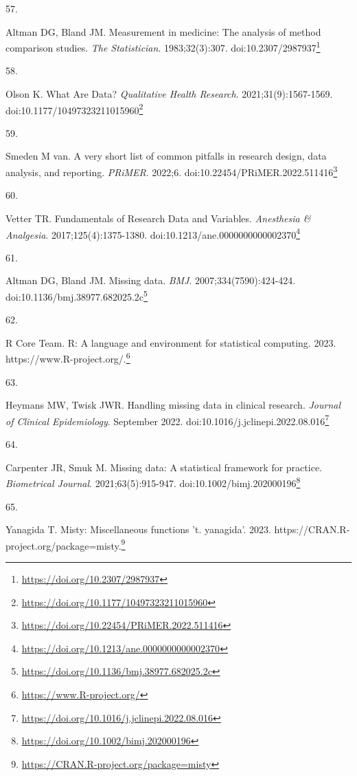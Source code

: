 \documentclass[
  a4paper,
]{book}
\newlength{\cslhangindent}
\newlength{\csllabelwidth}
\newlength{\cslentryspacingunit} %
\newenvironment{CSLReferences}[2] %
 {%
  \setlength{\parindent}{0pt}
  \ifodd #1
  \let\oldpar\par
  \def\par{\hangindent=\cslhangindent\oldpar}
  \fi
  \setlength{\parskip}{#2\cslentryspacingunit}
 }%
 {}
\newcommand{\CSLLeftMargin}[1]{\parbox[t]{\csllabelwidth}{#1}}
\newcommand{\CSLRightInline}[1]{\parbox[t]{\linewidth - \csllabelwidth}{#1}\break}
\renewcommand{\href}[2]{#2\footnote{\url{#1}}}
\begin{document}
\begin{CSLReferences}{0}{0}
\leavevmode{}%
\CSLLeftMargin{57. }%
\CSLRightInline{Altman DG, Bland JM. Measurement in medicine: The analysis of method comparison studies. \emph{The Statistician}. 1983;32(3):307. doi:\href{https://doi.org/10.2307/2987937}{10.2307/2987937}}

\leavevmode{}%
\CSLLeftMargin{58. }%
\CSLRightInline{Olson K. What Are Data? \emph{Qualitative Health Research}. 2021;31(9):1567-1569. doi:\href{https://doi.org/10.1177/10497323211015960}{10.1177/10497323211015960}}

\leavevmode{}%
\CSLLeftMargin{59. }%
\CSLRightInline{Smeden M van. A very short list of common pitfalls in research design, data analysis, and reporting. \emph{PRiMER}. 2022;6. doi:\href{https://doi.org/10.22454/PRiMER.2022.511416}{10.22454/PRiMER.2022.511416}}

\leavevmode{}%
\CSLLeftMargin{60. }%
\CSLRightInline{Vetter TR. Fundamentals of Research Data and Variables. \emph{Anesthesia \& Analgesia}. 2017;125(4):1375-1380. doi:\href{https://doi.org/10.1213/ane.0000000000002370}{10.1213/ane.0000000000002370}}

\leavevmode{}%
\CSLLeftMargin{61. }%
\CSLRightInline{Altman DG, Bland JM. Missing data. \emph{BMJ}. 2007;334(7590):424-424. doi:\href{https://doi.org/10.1136/bmj.38977.682025.2c}{10.1136/bmj.38977.682025.2c}}

\leavevmode{}%
\CSLLeftMargin{62. }%
\CSLRightInline{R Core Team. R: A language and environment for statistical computing. 2023. \href{https://www.R-project.org/}{https://www.R-project.org/.}}

\leavevmode{}%
\CSLLeftMargin{63. }%
\CSLRightInline{Heymans MW, Twisk JWR. Handling missing data in clinical research. \emph{Journal of Clinical Epidemiology}. September 2022. doi:\href{https://doi.org/10.1016/j.jclinepi.2022.08.016}{10.1016/j.jclinepi.2022.08.016}}

\leavevmode{}%
\CSLLeftMargin{64. }%
\CSLRightInline{Carpenter JR, Smuk M. Missing data: A statistical framework for practice. \emph{Biometrical Journal}. 2021;63(5):915-947. doi:\href{https://doi.org/10.1002/bimj.202000196}{10.1002/bimj.202000196}}

\leavevmode{}%
\CSLLeftMargin{65. }%
\CSLRightInline{Yanagida T. Misty: Miscellaneous functions 't. yanagida'. 2023. \href{https://CRAN.R-project.org/package=misty}{https://CRAN.R-project.org/package=misty.}}


\end{CSLReferences}
\end{document}
